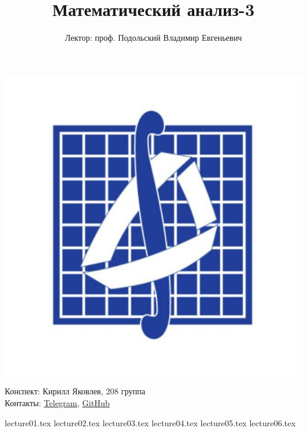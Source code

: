 \documentclass[a4paper, 12pt]{article}
\title{\textbf{Математический анализ-3}}
\author{Лектор: проф. Подольский Владимир Евгеньевич}
\begin{document}
    
\fontsize{14pt}{20pt}\selectfont
\maketitle
\vspace{0.3cm}
\begin{center}
    \includegraphics[width=0.75\linewidth]{Images/mehmat.png}
\end{center}
\vspace{1.5cm}
\begin{center}
    Конспект: Кирилл Яковлев, 208 группа\\
    Контакты: \href{https://t.me/fourkenz}{Telegram}, \href{https://github.com/yakovlevki}{GitHub}\\
\end{center}
    
\newpage
\tableofcontents
\newpage

{lecture01.tex}
{lecture02.tex}
{lecture03.tex}
{lecture04.tex}
{lecture05.tex}
{lecture06.tex}
\end{document}
